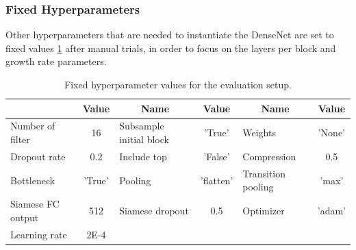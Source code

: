 \subsubsection{Fixed Hyperparameters}
Other hyperparameters that are needed to instantiate the DenseNet are set to fixed values \ref{table:architecture_gr_densenet_siamese} after manual trials, in order to focus on the layers per block and growth rate parameters.

\begin{table}[ht]
\centering
\caption{Fixed hyperparameter values for the evaluation setup.}
\resizebox{\textwidth}{!}
{\begin{tabular}{|l c| l c| l c|} 
 \hline\hline
 \rowcolor{lightgrey}
 \multicolumn{1}{|c}{\textbf{Name}} & \multicolumn{1}{c|}{\textbf{Value}} & \multicolumn{1}{c}{\textbf{Name}} & \multicolumn{1}{c|}{\textbf{Value}} & \multicolumn{1}{c}{\textbf{Name}} & \multicolumn{1}{c|}{\textbf{Value}} \\ [0.5ex] 
 \hline
 Number of filter & 16 & Subsample initial block & 'True' & Weights & 'None'\\
 \hline
 Dropout rate & 0.2 & Include top & 'False' & Compression & 0.5\\
 \hline
 Bottleneck & 'True' & Pooling & 'flatten' & Transition pooling & 'max' \\
 \hline
 Siamese FC output & 512 & Siamese dropout & 0.5 & Optimizer & 'adam' \\
 \hline
 Learning rate & 2E-4 & & & & \\
 \hline \hline
\end{tabular}}
\label{table:architecture_gr_densenet_siamese}
\end{table}

